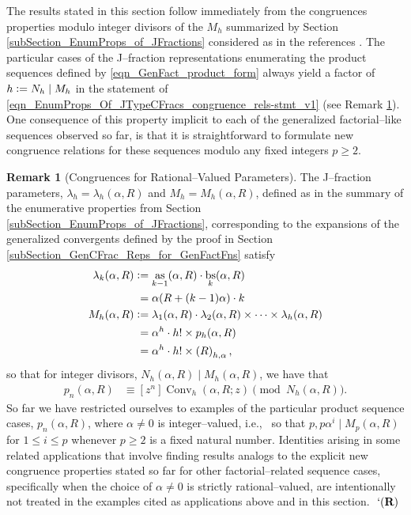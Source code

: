 \documentclass[12pt,reqno]{article}
\numberwithin{sfootnote}{section}
\numberwithin{equation}{section}
\theoremstyle{DefaultTheoremStyle}
\theoremstyle{definition}
\newtheorem{remark}[theorem]{Remark}
\newcommand{\eolqedsymbol}[1]{{\hrulefill\ensuremath{\ #1}}}
\renewcommand{\eolqedsymbol}[1]{{\mboxfill{ }\ensuremath{\ #1}}}
\newcommand{\RemarkQEDSymbol}{`(\text{\rm{\bf R}})}
\newcommand{\RemarkQED}{\eolqedsymbol{\RemarkQEDSymbol}}
\newcommand{\cf}[0]{cf.\ }
\newcommand{\ie}[0]{i.e.,\ }
\newcommand{\defequals}{\ensuremath{\vcentcolon=}}
\newcommand{\Pochhammer}[2]{\ensuremath{\left(#1\right)_{#2}}}
\newcommand{\ConvGF}[4]{\ensuremath{\Conv_{#1}\left(#2, #3; #4\right)}}
\DeclareMathOperator{\Conv}{Conv}
\DeclareMathOperator{\as}{as}
\DeclareMathOperator{\bs}{bs}
\begin{document}
The results stated in this section follow immediately 
from the congruences properties modulo integer divisors of the $M_h$ 
summarized by Section \ref{subSection_EnumProps_of_JFractions} 
considered as in the references \citep{FLAJOLET80B,FLAJOLET82} 
\citep[\cf \S 5.7]{GFLECT}. 
The particular cases of the J--fraction representations enumerating the 
product sequences defined by \eqref{eqn_GenFact_product_form} 
always yield a factor of $h \defequals N_h \mid M_h$ in the statement of 
\eqref{eqn_EnumProps_Of_JTypeCFracs_congruence_rels-stmt_v1} 
(see Remark \ref{remark_Congruences_for_Rational-Valued_Params}). 
One consequence of this property implicit to each of the generalized 
factorial--like sequences observed so far, is that it is straightforward to 
formulate new congruence relations for these sequences modulo any 
fixed integers $p \geq 2$. 

\begin{remark}[Congruences for Rational--Valued Parameters] 
\label{remark_Congruences_for_Rational-Valued_Params} 
The J--fraction parameters, 
$\lambda_h = \lambda_h(\alpha, R)$ and $M_h = M_h(\alpha, R)$, 
defined as in the summary of the enumerative properties from 
Section \ref{subSection_EnumProps_of_JFractions}, 
corresponding to the 
expansions of the generalized convergents defined by the proof in 
Section \ref{subSection_GenCFrac_Reps_for_GenFactFns} 
satisfy 
\begin{align*} 
\lambda_k(\alpha, R) & \defequals 
     \as_{k-1}(\alpha, R) \cdot \bs_{k}(\alpha, R) \\ 
   & \phantom{:} = 
     \alpha (R + (k-1) \alpha) \cdot k \\ 
M_h(\alpha, R) & \defequals 
     \lambda_1(\alpha, R) \cdot \lambda_2(\alpha, R) 
     \times \cdots \times 
     \lambda_h(\alpha, R) \\ 
   & \phantom{:} = 
     \alpha^{h} \cdot h! \times p_h(\alpha, R) \\ 
   & \phantom{:} = 
   \alpha^{h} \cdot h! \times \Pochhammer{R}{h,\alpha}, 
\end{align*} 
so that for integer divisors, $N_h(\alpha, R) \mid M_h(\alpha, R)$, 
we have that 
\begin{align*} 
p_n(\alpha, R) & \equiv 
     [z^n] \ConvGF{h}{\alpha}{R}{z} \pmod{N_h(\alpha, R)}. 
\end{align*} 
So far we have restricted ourselves to examples of the 
particular product sequence cases, $p_n(\alpha, R)$, 
where $\alpha \neq 0$ is integer--valued, \ie 
so that $p, p\alpha^{i} \mid M_p(\alpha, R)$ for $1 \leq i \leq p$ 
whenever $p \geq 2$ is a fixed natural number. 
Identities arising in some 
related applications that involve finding results analogs to the 
explicit new congruence properties stated so far for other 
factorial--related sequence cases, specifically when the choice of 
$\alpha \neq 0$ is strictly rational--valued, 
are intentionally not treated in the examples cited as applications 
above and in this section. 
\RemarkQED 
\end{remark} 
\end{document}
